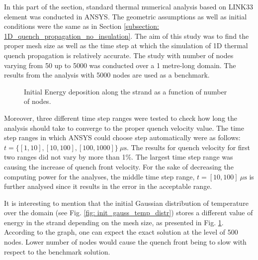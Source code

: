 
In this part of the section, standard thermal numerical analysis based on LINK33 element was conducted in ANSYS. The geometric assumptions as well as initial conditions were the same as in Section \ref{subsection: 1D_quench_propagation_no_insulation}. The aim of this study was to find the proper mesh size as well as the time step at which the simulation of 1D thermal quench propagation is relatively accurate. The study with number of nodes varying from 50 up to 5000 was conducted over a 1 metre-long domain. The results from the analysis with 5000 nodes are used as a benchmark. 

\begin{figure}[h!]
\centering
    \caption{Initial Energy deposition along the strand as a function of number of nodes.}
    \label{fig: q_vel_modelling_energy_deposition}
\end{figure}

Moreover, three different time step ranges were tested to check how long the analysis should take to converge to the proper quench velocity value. The time step ranges in which ANSYS could choose step automatically were as follows:  $t= \{[1, 10], [10, 100], [100, 1000]\}~\mu \text{s}$. The results for quench velocity for first two ranges did not vary by more than 1\%. The largest time step range was causing the increase of quench front velocity. For the sake of decreasing the computing power for the analyses, the middle time step range,  $t=[10, 100]~\mu \text{s}$ is further analysed since it results in the error in the acceptable range.

It is interesting to mention that the initial Gaussian distribution of temperature over the domain (see Fig. \ref{fig: init_gauss_temp_distr}) stores a different value of energy in the strand depending on the mesh size, as presented in Fig. \ref{fig: q_vel_modelling_energy_deposition}. According to the graph, one can expect the exact solution at the level of 500 nodes. Lower number of nodes would cause the quench front being to slow with respect to the benchmark solution.

